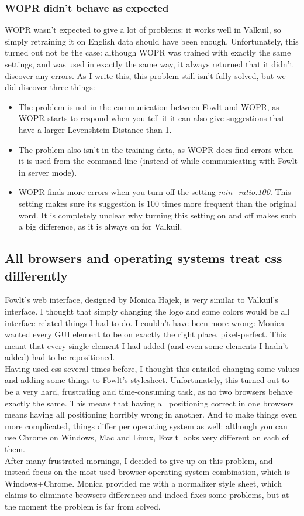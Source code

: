\documentclass[12pt]{article}
\begin{document}
\subsubsection{WOPR didn't behave as expected}
WOPR wasn't expected to give a lot of problems: it works well in Valkuil, so simply retraining it on English data should have been enough. Unfortunately, this turned out not be the case: although WOPR was trained with exactly the same settings, and was used in exactly the same way, it always returned that it didn't discover any errors. As I write this, this problem still isn't fully solved, but we did discover three things: 

\begin{itemize}

\item The problem is not in the communication between Fowlt and WOPR, as WOPR starts to respond when you tell it it can also give suggestions that have a larger Levenshtein Distance than 1.
\item The problem also isn't in the training data, as WOPR does find errors when it is used from the command line (instead of while communicating with Fowlt in server mode).
\item WOPR finds more errors when you turn off the setting \emph{min\_ratio:100}. This setting makes sure its suggestion is 100 times more frequent than the original word. It is completely unclear why turning this setting on and off makes such a big difference, as it is always on for Valkuil.

\end{itemize}

\subsection{All browsers and operating systems treat css differently}
Fowlt's web interface, designed by Monica Hajek, is very similar to Valkuil's interface. I thought that simply changing the logo and some colors would be all interface-related things I had to do. I couldn't have been more wrong: Monica wanted every GUI element to be on exactly the right place, pixel-perfect. This meant that every single element I had added (and even some elements I hadn't added) had to be repositioned.\\\indent
Having used css several times before, I thought this entailed changing some values and adding some things to Fowlt's stylesheet. Unfortunately, this turned out to be a very hard, frustrating and time-consuming task, as no two browsers behave exactly the same. This means that having all positioning correct in one browsers means having all positioning horribly wrong in another. And to make things even more complicated, things differ per operating system as well: although you can use Chrome on Windows, Mac and Linux, Fowlt looks very different on each of them.\\\indent
After many frustrated mornings, I decided to give up on this problem, and instead focus on the most used browser-operating system combination, which is Windows+Chrome. Monica provided me with a normalizer style sheet, which claims to eliminate browsers differences and indeed fixes some problems, but at the moment the problem is far from solved.
\end{document}
